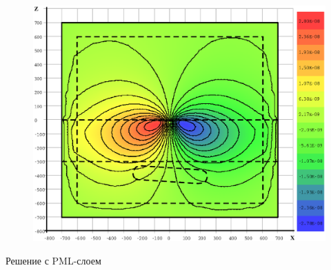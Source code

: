 \documentclass[aspectratio=43,usepdftitle=false]{beamer}
\begin{document}
\begin{frame}
\begin{columns}[t,totalwidth=\linewidth]
\begin{column}{.5\linewidth}
\begin{figure}[H]
				\includegraphics[width=1.1\textwidth,height=1.1\textheight,keepaspectratio]{airloop_pml_y=0_EyR.eps}
			\end{figure}
			\begin{center}
				\vspace{-1em}
				\tiny{Решение с PML-слоем}
			\end{center}
		\end{column}
	\end{columns}
\end{frame}

\end{document}
